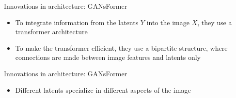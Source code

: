 \begin{frame}{Innovations in architecture: GANsFormer}
\protect\hypertarget{innovations-in-architecture-gansformer-2}{}

\begin{itemize}
\tightlist
\item
  To integrate information from the latents \(Y\) into the image \(X\),
  they use a transformer architecture
\item
  To make the transformer efficient, they use a bipartite structure,
  where connections are made between image features and latents only
\end{itemize}


\end{frame}

\begin{frame}{Innovations in architecture: GANsFormer}
\protect\hypertarget{innovations-in-architecture-gansformer-3}{}

\begin{itemize}
\tightlist
\item
  Different latents specialize in different aspects of the image
\end{itemize}


\end{frame}

